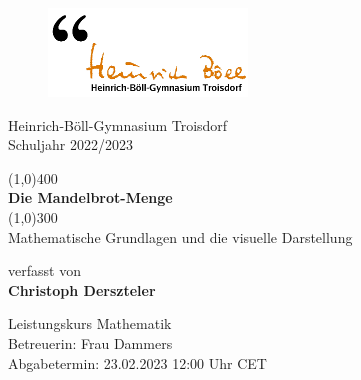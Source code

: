 \begin{center}
  \begin{figure}
    \vspace{-2cm}
    \hspace{-2cm}
    \includegraphics[scale=0.75]{images/heinrichboellgymnasium}
  \end{figure}

  \vspace{1cm}
  Heinrich-Böll-Gymnasium Troisdorf\\
  Schuljahr 2022/2023

  \vspace{1cm}
  \Huge
  \line(1,0){400}\\
  \textbf{Die Mandelbrot-Menge}\\
  \line(1,0){300}\\

  \vspace{0.75cm}
  \Large
  Mathematische Grundlagen und die visuelle Darstellung

  \vspace{2cm}
  \large
  verfasst von\\
  \Large
  \textbf{Christoph Derszteler}

  \vfill
  \large
  Leistungskurs Mathematik\\
  Betreuerin: Frau Dammers\\
  Abgabetermin: 23.02.2023 12:00 Uhr CET\\
\end{center}
\thispagestyle{empty}